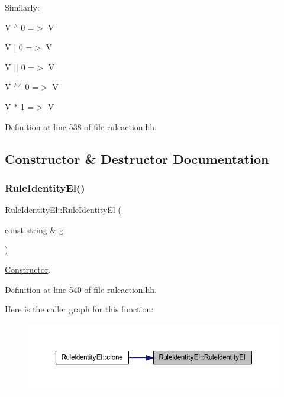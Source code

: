 Similarly\+:
\begin{DoxyItemize}
\item {\ttfamily V $^\wedge$ 0 =$>$ V}
\item {\ttfamily V $\vert$ 0 =$>$ V}
\item {\ttfamily V $\vert$$\vert$ 0 =$>$ V}
\item {\ttfamily V $^\wedge$$^\wedge$ 0 =$>$ V}
\item {\ttfamily V $\ast$ 1 =$>$ V} 
\end{DoxyItemize}

Definition at line 538 of file ruleaction.\+hh.



\subsection{Constructor \& Destructor Documentation}
\mbox{\label{class_rule_identity_el_afc0361193dad4ad16cc7871cceda1528}} 
\subsubsection{\texorpdfstring{RuleIdentityEl()}{RuleIdentityEl()}}
{\footnotesize\ttfamily Rule\+Identity\+El\+::\+Rule\+Identity\+El (\begin{DoxyParamCaption}\item[{const string \&}]{g }\end{DoxyParamCaption})\hspace{0.3cm}{\ttfamily [inline]}}



\mbox{\hyperlink{class_constructor}{Constructor}}. 



Definition at line 540 of file ruleaction.\+hh.

Here is the caller graph for this function\+:
\nopagebreak
\begin{figure}[H]
\begin{center}
\leavevmode
\includegraphics[width=350pt]{class_rule_identity_el_afc0361193dad4ad16cc7871cceda1528_icgraph}
\end{center}
\end{figure}


